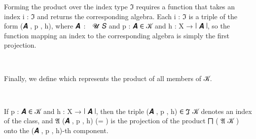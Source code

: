 \documentclass[a4paper,UKenglish,cleveref,autoref,thm-restate,11pt]{lipics-v2021}
\begin{document}
Forming the product over the index type \af ℑ requires a function that takes an index \ab i \as : \af ℑ and returns the corresponding algebra. Each \ab i \as : \af ℑ is a triple of the form (\ab 𝑨 , \ab p , \ab h), where \ab 𝑨~\as :~~\ab 𝓤~\ab 𝑆 and \ab p \as : \ab 𝑨 \af ∈ \ab 𝒦 and \ab h \as : \ab X \as → \af ∣ \ab 𝑨 \as ∣, so the function mapping an index to the corresponding algebra is simply the first projection.
\ccpad
\begin{code}%
\>[1]\AgdaSpace{}%
\AgdaSymbol{:}\AgdaSpace{}%
\AgdaSymbol{(}\AgdaSpace{}%
\AgdaSymbol{:}\AgdaSpace{}%
\AgdaSpace{}%
\AgdaSymbol{(}\AgdaSpace{}%
\AgdaSpace{}%
\AgdaSymbol{)(}\AgdaSpace{}%
\AgdaSymbol{))}\AgdaSpace{}%
\AgdaSpace{}%
\AgdaSpace{}%
\AgdaSpace{}%
\AgdaSpace{}%
\AgdaSpace{}%
\AgdaSpace{}%
\<%
\\
%
\>[1]\AgdaSpace{}%
\AgdaSpace{}%
\AgdaSymbol{=}\AgdaSpace{}%
\AgdaSpace{}%
\AgdaSymbol{(}\AgdaSpace{}%
\AgdaSymbol{:}\AgdaSpace{}%
\AgdaSymbol{(}\AgdaSpace{}%
\AgdaSymbol{))}\AgdaSpace{}%
\AgdaSpace{}%
\AgdaSpace{}%
\AgdaSpace{}%
\<%
\end{code}
\ccpad
Finally, we define  which represents the product of all members of \ab 𝒦.
\ccpad
\begin{code}%
\>[1]\AgdaSpace{}%
\AgdaSymbol{:}\AgdaSpace{}%
\AgdaSpace{}%
\AgdaSymbol{(}\AgdaSpace{}%
\AgdaSpace{}%
\AgdaSymbol{)(}\AgdaSpace{}%
\AgdaSymbol{)}\AgdaSpace{}%
\AgdaSpace{}%
\AgdaSpace{}%
\AgdaSymbol{(}\AgdaSpace{}%
\AgdaSpace{}%
\AgdaSpace{}%
\AgdaSymbol{)}\AgdaSpace{}%
\<%
\\
%
\>[1]\AgdaSpace{}%
\AgdaSpace{}%
\AgdaSymbol{=}\AgdaSpace{}%
\AgdaSpace{}%
\AgdaSymbol{(}\AgdaSpace{}%
\AgdaSpace{}%
\AgdaSpace{}%
\AgdaSymbol{)}\<%
\end{code}
\ccpad
If \ab p \as : \ab 𝑨 \af ∈ \ab 𝒦 and \ab h \as : \ab X \as → \af ∣ \ab 𝑨 \af ∣, then the triple (\ab 𝑨 , \ab p , \ab h) \af ∈ \af ℑ \ab 𝒦 denotes an index of the class, and \af 𝔄 (\ab 𝑨 , \ab p , \ab h) (= ) is the projection of the product \af ⨅ ( \af 𝔄 \ab 𝒦 ) onto the (\ab 𝑨 , \ab p , \ab h)-th component.
\end{document}
